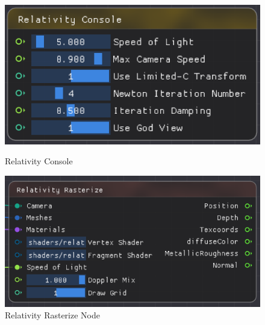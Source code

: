 \documentclass{article}
\begin{document}
\begin{figure}[htbp]
    \centering
    \setlength{\abovecaptionskip}{0.cm}
    \begin{minipage}[b]{0.3\linewidth}
        \centering
        \includegraphics[width=\textwidth]{Console.png}
        \caption{Relativity Console}
        \label{console}
    \end{minipage}
    \quad
    \begin{minipage}[b]{0.5\linewidth}
        \centering
        \includegraphics[width=\textwidth]{RelativityRasterize.png}
        \caption{Relativity Rasterize Node}
        \label{re_rasterize}
    \end{minipage}
\end{figure}
\end{document}
